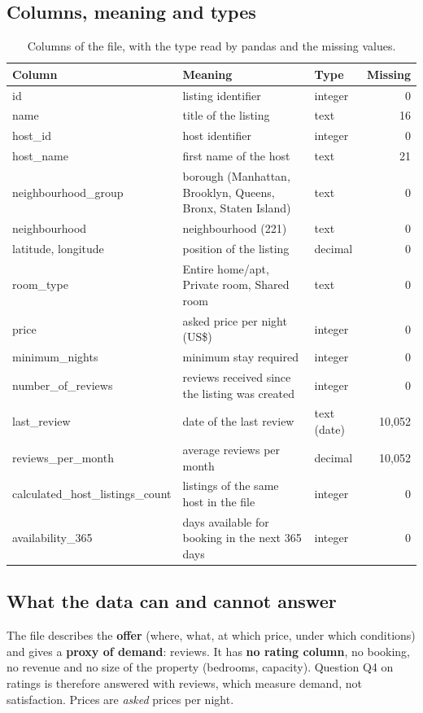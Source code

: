 \documentclass[12pt,a4paper]{article}
\begin{document}
\subsection{Columns, meaning and types}

\begin{table}[H]\centering\small
\caption{Columns of the file, with the type read by pandas and the missing values.}
\begin{tabularx}{\linewidth}{@{}lXlr@{}}
\toprule
Column & Meaning & Type & Missing\\\midrule
id & listing identifier & integer & 0\\
name & title of the listing & text & 16\\
host\_id & host identifier & integer & 0\\
host\_name & first name of the host & text & 21\\
neighbourhood\_group & borough (Manhattan, Brooklyn, Queens, Bronx, Staten Island) & text & 0\\
neighbourhood & neighbourhood (221) & text & 0\\
latitude, longitude & position of the listing & decimal & 0\\
room\_type & Entire home/apt, Private room, Shared room & text & 0\\
price & asked price per night (US\$) & integer & 0\\
minimum\_nights & minimum stay required & integer & 0\\
number\_of\_reviews & reviews received since the listing was created & integer & 0\\
last\_review & date of the last review & text (date) & 10{,}052\\
reviews\_per\_month & average reviews per month & decimal & 10{,}052\\
calculated\_host\_listings\_count & listings of the same host in the file & integer & 0\\
availability\_365 & days available for booking in the next 365 days & integer & 0\\
\bottomrule
\end{tabularx}
\end{table}

\subsection{What the data can and cannot answer}

The file describes the \textbf{offer} (where, what, at which price, under which conditions) and gives
a \textbf{proxy of demand}: reviews. It has \textbf{no rating column}, no booking, no revenue and no
size of the property (bedrooms, capacity). Question Q4 on ratings is therefore answered with reviews,
which measure demand, not satisfaction. Prices are \emph{asked} prices per night.
\end{document}
